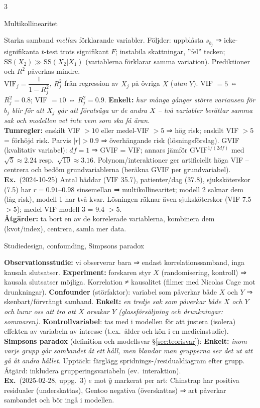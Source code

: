 \documentclass[8pt]{extarticle}
\makeatletter
\newcounter{sect}
\newcommand{\sect}[3][hd]{\par\vspace{1.5pt}\refstepcounter{sect}\noindent
  {\setlength{\fboxsep}{1.8pt}\colorbox{#1}{\parbox{\dimexpr\linewidth-2\fboxsep}{\color{white}\sffamily\bfseries
  \strut\thesect\enspace #2}}}\label{#3}\par\nobreak\vspace{0.8pt}\@afterheading}
\newcommand{\ex}{{\color{ex}\sffamily\bfseries Ex.}\ }
\newcommand{\enk}[1]{{\color{cEnk}\sffamily\bfseries Enkelt:} {\itshape #1}}
\newcommand{\SSq}{\mathrm{SS}}
\makeatother
\begin{document}
\begin{multicols*}{3}
\sect[cDiag]{Multikollinearitet}{sec:vif}
Starka samband \emph{mellan} förklarande variabler. Följder: uppblåsta $s_{b_j}$ ⇒ icke-signifikanta $t$-test trots signifikant $F$; instabila skattningar, ”fel” tecken; $\SSq(X_2)\gg\SSq(X_2|X_1)$ (variablerna förklarar samma variation). Prediktioner och $R^2$ påverkas mindre.\\[1pt]
$\mathrm{VIF}_j=\dfrac{1}{1-R_j^2}$, $R_j^2$ från regression av $X_j$ på övriga $X$ (\emph{utan} $Y$). VIF $=5$ ⇔ $R_j^2=0.8$; VIF $=10$ ⇔ $R_j^2=0.9$. \enk{hur många gånger större variansen för $b_j$ blir för att $X_j$ går att förutsäga ur de andra $X$ – två variabler berättar samma sak och modellen vet inte vem som ska få äran.}\\
\textbf{Tumregler:} enskilt VIF $>10$ eller medel-VIF $>5$ ⇒ hög risk; enskilt VIF $>5$ = förhöjd risk. Parvis $|r|>0.9$ ⇒ överhängande risk (lösningsförslag). GVIF (kvalitativ variabel): $df=1$ ⇒ GVIF = VIF; annars jämför $\text{GVIF}^{1/(2df)}$ med $\sqrt5\approx2.24$ resp.\ $\sqrt{10}\approx3.16$.
Polynom/interaktioner ger artificiellt höga VIF – centrera och bedöm grundvariablerna (beräkna GVIF per grundvariabel).\\
\ex (2024-10-25) Antal bäddar (VIF 35.7), patienter/dag (37.8), sjuksköterskor (7.5) har $r=0.91$–$0.98$ sinsemellan ⇒ multikollinearitet; modell 2 saknar dem (låg risk), modell 1 har två kvar. Lösningen räknar även sjuksköterskor (VIF 7.5 $>5$); medel-VIF modell 3 = 9.4 $>5$.\\
\textbf{Åtgärder:} ta bort en av de korrelerade variablerna, kombinera dem (kvot/index), centrera, samla mer data.

\sect[cGrund]{Studiedesign, confounding, Simpsons paradox}{sec:design}
\textbf{Observationsstudie:} vi observerar bara ⇒ endast korrelationssamband, inga kausala slutsatser. \textbf{Experiment:} forskaren styr $X$ (randomisering, kontroll) ⇒ kausala slutsatser möjliga. Korrelation ≠ kausalitet (filmer med Nicolas Cage mot drunkningar).
\textbf{Confounder} (störfaktor): variabel som påverkar både $X$ och $Y$ ⇒ skenbart/förvrängt samband. \enk{en tredje sak som påverkar både $X$ och $Y$ och lurar oss att tro att $X$ orsakar $Y$ (glassförsäljning och drunkningar: sommaren).} \textbf{Kontrollvariabel}: tas med i modellen för att justera (isolera) effekten av variabeln av intresse (t.ex.\ ålder och kön i en medicinstudie).\\
\textbf{Simpsons paradox} (definition och modellsvar §\ref{sec:teorisvar}): \enk{inom varje grupp går sambandet åt ett håll, men blandar man grupperna ser det ut att gå åt andra hållet.} Upptäck: färglägg spridnings-/residualdiagram efter grupp. Åtgärd: inkludera grupperingsvariabeln (ev.\ interaktion).\\
\ex (2025-02-28, uppg.\ 3) $e$ mot $\hat y$ markerat per art: Chinstrap har positiva residualer (underskattas), Gentoo negativa (överskattas) ⇒ art påverkar sambandet och bör ingå i modellen.


\end{multicols*}
\end{document}
